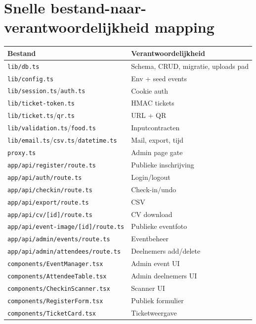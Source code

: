 \documentclass[11pt,a4paper]{report}
\begin{document}
\section{Snelle bestand-naar-verantwoordelijkheid mapping}
\begin{longtable}{@{}p{}p{}@{}}
\toprule
Bestand & Verantwoordelijkheid \\
\midrule
\endhead
\texttt{lib/db.ts} & Schema, CRUD, migratie, uploads pad \\
\texttt{lib/config.ts} & Env + seed events \\
\texttt{lib/session.ts}/\texttt{auth.ts} & Cookie auth \\
\texttt{lib/ticket-token.ts} & HMAC tickets \\
\texttt{lib/ticket.ts}/\texttt{qr.ts} & URL + QR \\
\texttt{lib/validation.ts}/\texttt{food.ts} & Inputcontracten \\
\texttt{lib/email.ts}/\texttt{csv.ts}/\texttt{datetime.ts} & Mail, export, tijd \\
\texttt{proxy.ts} & Admin page gate \\
\texttt{app/api/register/route.ts} & Publieke inschrijving \\
\texttt{app/api/auth/route.ts} & Login/logout \\
\texttt{app/api/checkin/route.ts} & Check-in/undo \\
\texttt{app/api/export/route.ts} & CSV \\
\texttt{app/api/cv/[id]/route.ts} & CV download \\
\texttt{app/api/event-image/[id]/route.ts} & Publieke eventfoto \\
\texttt{app/api/admin/events/route.ts} & Eventbeheer \\
\texttt{app/api/admin/attendees/route.ts} & Deelnemers add/delete \\
\texttt{components/EventManager.tsx} & Admin event UI \\
\texttt{components/AttendeeTable.tsx} & Admin deelnemers UI \\
\texttt{components/CheckinScanner.tsx} & Scanner UI \\
\texttt{components/RegisterForm.tsx} & Publiek formulier \\
\texttt{components/TicketCard.tsx} & Ticketweergave \\
\bottomrule
\end{longtable}
\end{document}
